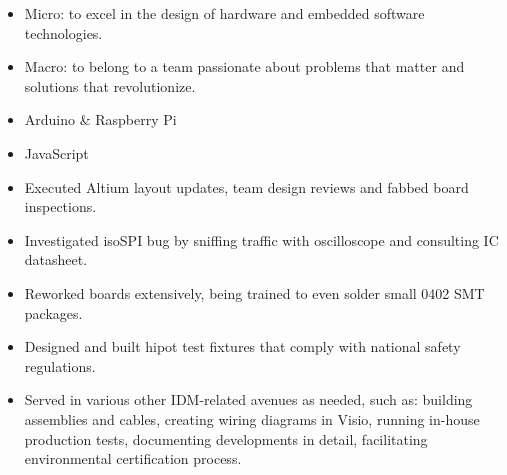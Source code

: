 \documentclass{resume}
\begin{document}




\begin{itemize}[parsep=0.5ex]
\item Micro: to excel in the design of hardware and embedded software technologies.
\item Macro: to belong to a team passionate about problems that matter and solutions that revolutionize.
\end{itemize}


\begin{itemize}[parsep=0.5ex]
\item %
Arduino \& Raspberry Pi

\item %
JavaScript

\end{itemize}


\begin{itemize}
\item Executed Altium layout updates, team design reviews and fabbed board inspections.
\item Investigated isoSPI bug by sniffing traffic with oscilloscope and consulting IC datasheet.
\item Reworked boards extensively, being trained to even solder small 0402 SMT packages.
\item Designed and built hipot test fixtures that comply with national safety regulations.
\item Served in various other IDM-related avenues as needed, such as: building assemblies and cables, creating wiring diagrams in Visio, running in-house production tests, documenting developments in detail, facilitating environmental certification process.
\end{itemize}
\end{document}
